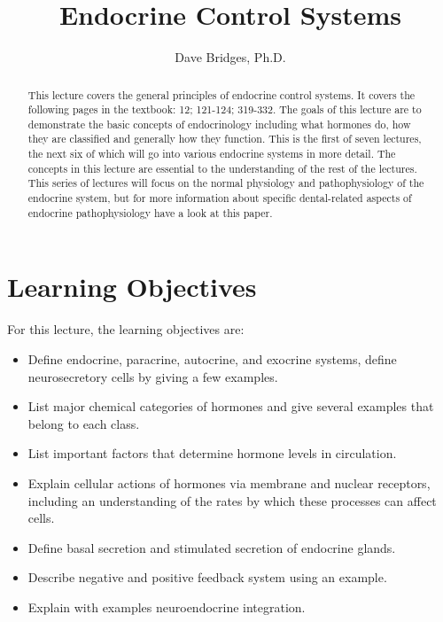 \documentclass{tufte-handout}
\title{Endocrine Control Systems}
\author{Dave Bridges, Ph.D.}
\begin{document}
\maketitle%

\begin{abstract}
\noindent This lecture covers the general principles of endocrine control systems.  It covers the following pages in the textbook: 12; 121-124; 319-332\cite{Widmaier2013}.  The goals of this lecture are to demonstrate the basic concepts of endocrinology including what hormones do, how they are classified and generally how they function.  This is the first of seven lectures, the next six of which will go into various endocrine systems in more detail.  The concepts in this lecture are essential to the understanding of the rest of the lectures.  This series of lectures will focus on the normal physiology and pathophysiology of the endocrine system, but for more information about specific dental-related aspects of endocrine pathophysiology have a look at this paper\cite{Carlos2010}.
\end{abstract}

\tableofcontents

\pagebreak

\section{Learning Objectives}
For this lecture, the learning objectives are:
\begin{itemize}
\item Define endocrine, paracrine, autocrine, and exocrine systems, define neurosecretory cells by giving a few examples.
\item List major chemical categories of hormones and give several examples that belong to each class.
\item List important factors that determine hormone levels in circulation.
\item Explain cellular actions of hormones via membrane and nuclear receptors, including an understanding of the rates by which these processes can affect cells.
\item Define basal secretion and stimulated secretion of endocrine glands.
\item Describe negative and positive feedback system using an example.
\item Explain with examples neuroendocrine integration.
\end{itemize}
\end{document}
